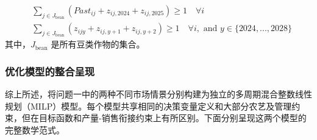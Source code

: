 \begin{align}
	 & \sum_{j \in J_{\text{bean}}} (Past_{ij} + z_{ij,2024} + z_{ij,2025}) \ge 1 \quad \forall i                                   \\
	 & \sum_{j \in J_{\text{bean}}} (z_{ijy} + z_{ij,y+1} + z_{ij,y+2}) \ge 1 \quad \forall i, \text{ and } y \in \{2024,...,2028\}
\end{align}
其中，$J_{\text{bean}}$ 是所有豆类作物的集合。

\subsubsection{优化模型的整合呈现}

综上所述，将问题一中的两种不同市场情景分别构建为独立的多周期混合整数线性规划（MILP）模型。每个模型共享相同的决策变量定义和大部分农艺及管理约束，但在目标函数和产量-销售衔接约束上有所区别。下面分别呈现这两个模型的完整数学范式。

